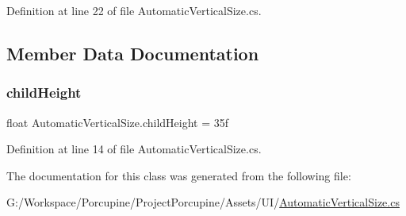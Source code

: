 Definition at line 22 of file Automatic\+Vertical\+Size.\+cs.



\subsection{Member Data Documentation}
\mbox{\label{class_automatic_vertical_size_a168ddf84313ccbc06cea6f692ab96f76}} 
\subsubsection{\texorpdfstring{child\+Height}{childHeight}}
{\footnotesize\ttfamily float Automatic\+Vertical\+Size.\+child\+Height = 35f}



Definition at line 14 of file Automatic\+Vertical\+Size.\+cs.



The documentation for this class was generated from the following file\+:\begin{DoxyCompactItemize}
\item 
G\+:/\+Workspace/\+Porcupine/\+Project\+Porcupine/\+Assets/\+U\+I/\hyperlink{_automatic_vertical_size_8cs}{Automatic\+Vertical\+Size.\+cs}\end{DoxyCompactItemize}

